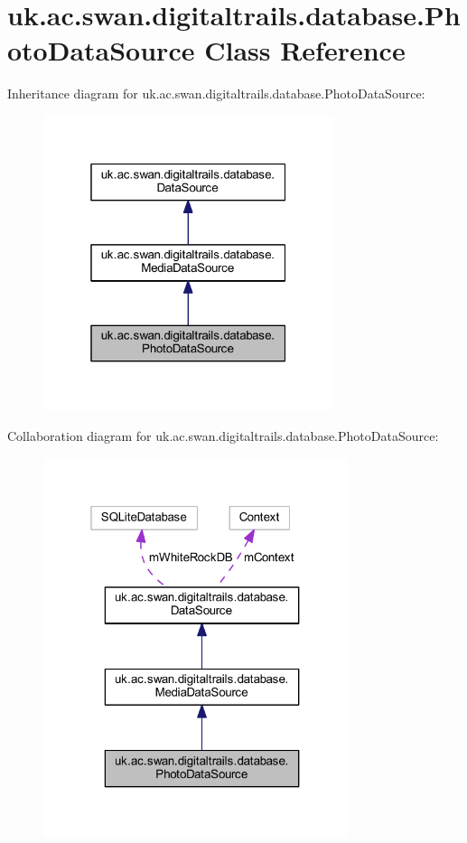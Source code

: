 \hypertarget{classuk_1_1ac_1_1swan_1_1digitaltrails_1_1database_1_1_photo_data_source}{\section{uk.\+ac.\+swan.\+digitaltrails.\+database.\+Photo\+Data\+Source Class Reference}
\label{classuk_1_1ac_1_1swan_1_1digitaltrails_1_1database_1_1_photo_data_source}
}


Inheritance diagram for uk.\+ac.\+swan.\+digitaltrails.\+database.\+Photo\+Data\+Source\+:\nopagebreak
\begin{figure}[H]
\begin{center}
\leavevmode
\includegraphics[width=241pt]{classuk_1_1ac_1_1swan_1_1digitaltrails_1_1database_1_1_photo_data_source__inherit__graph}
\end{center}
\end{figure}


Collaboration diagram for uk.\+ac.\+swan.\+digitaltrails.\+database.\+Photo\+Data\+Source\+:\nopagebreak
\begin{figure}[H]
\begin{center}
\leavevmode
\includegraphics[width=253pt]{classuk_1_1ac_1_1swan_1_1digitaltrails_1_1database_1_1_photo_data_source__coll__graph}
\end{center}
\end{figure}
